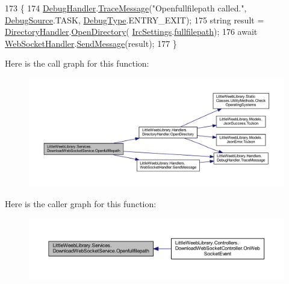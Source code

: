 \begin{DoxyCode}
173         \{
174             \mbox{\hyperlink{class_little_weeb_library_1_1_handlers_1_1_debug_handler}{DebugHandler}}.\mbox{\hyperlink{class_little_weeb_library_1_1_handlers_1_1_debug_handler_afccb37dfd6b2114af72000c2f4fe4607}{TraceMessage}}(\textcolor{stringliteral}{"Openfullfilepath called."}, 
      \mbox{\hyperlink{namespace_little_weeb_library_1_1_handlers_a2a6ca0775121c9c503d58aa254d292be}{DebugSource}}.TASK, \mbox{\hyperlink{namespace_little_weeb_library_1_1_handlers_ab66019ed40462876ec4e61bb3ccb0a62}{DebugType}}.ENTRY\_EXIT);
175             \textcolor{keywordtype}{string} result = \mbox{\hyperlink{class_little_weeb_library_1_1_handlers_1_1_directory_handler}{DirectoryHandler}}.\mbox{\hyperlink{class_little_weeb_library_1_1_handlers_1_1_directory_handler_a4f3f5841ead561873cc5130efc6294aa}{OpenDirectory}}(
      \mbox{\hyperlink{class_little_weeb_library_1_1_settings_1_1_irc_settings}{IrcSettings}}.\mbox{\hyperlink{class_little_weeb_library_1_1_settings_1_1_irc_settings_ad1f67b09e16ba2b5fed2dcdefeac8e1a}{fullfilepath}});
176             await \mbox{\hyperlink{class_little_weeb_library_1_1_handlers_1_1_web_socket_handler}{WebSocketHandler}}.\mbox{\hyperlink{class_little_weeb_library_1_1_handlers_1_1_web_socket_handler_a1de289d54d665a32c93478c68d3e6ad0}{SendMessage}}(result);
177         \}
\end{DoxyCode}
Here is the call graph for this function\+:\nopagebreak
\begin{figure}[H]
\begin{center}
\leavevmode
\includegraphics[width=350pt]{class_little_weeb_library_1_1_services_1_1_download_web_socket_service_a6f2201dd7b86f142c2e901262ea53fbe_cgraph}
\end{center}
\end{figure}
Here is the caller graph for this function\+:\nopagebreak
\begin{figure}[H]
\begin{center}
\leavevmode
\includegraphics[width=350pt]{class_little_weeb_library_1_1_services_1_1_download_web_socket_service_a6f2201dd7b86f142c2e901262ea53fbe_icgraph}
\end{center}
\end{figure}
